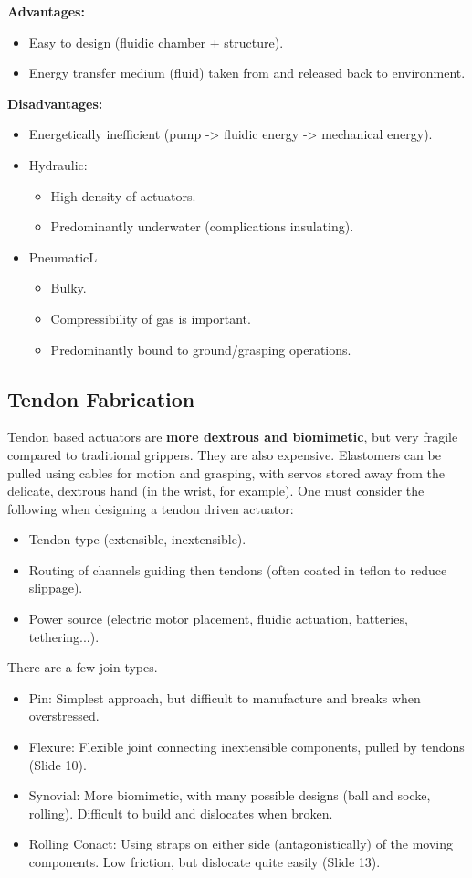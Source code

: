 \documentclass[onecolumn,a4paper]{article}
\begin{document}
\textbf{Advantages:}
\begin{itemize}
    \item Easy to design (fluidic chamber + structure).
    \item Energy transfer medium (fluid) taken from and released back to environment.
\end{itemize}
\textbf{Disadvantages:}
\begin{itemize}
    \item Energetically inefficient (pump -> fluidic energy -> mechanical energy).
    \item Hydraulic:
    \begin{itemize}
        \item High density of actuators.
        \item Predominantly underwater (complications insulating).
    \end{itemize}
    \item PneumaticL
    \begin{itemize}
        \item Bulky.
        \item Compressibility of gas is important.
        \item Predominantly bound to ground/grasping operations.
    \end{itemize}
\end{itemize}

\subsection{Tendon Fabrication}

Tendon based actuators are \textbf{more dextrous and biomimetic}, but very fragile compared to traditional grippers. They are also expensive. Elastomers can be pulled using cables for motion and grasping, with servos stored away from the delicate, dextrous hand (in the wrist, for example). One must consider the following when designing a tendon driven actuator:
\begin{itemize}
    \item Tendon type (extensible, inextensible).
    \item Routing of channels guiding then tendons (often coated in teflon to reduce slippage).
    \item Power source (electric motor placement, fluidic actuation, batteries, tethering...).
\end{itemize}

There are a few join types.
\begin{itemize}
    \item Pin: Simplest approach, but difficult to manufacture and breaks when overstressed.
    \item Flexure: Flexible joint connecting inextensible components, pulled by tendons (Slide 10).
    \item Synovial: More biomimetic, with many possible designs (ball and socke, rolling). Difficult to build and dislocates when broken.
    \item Rolling Conact: Using straps on either side (antagonistically) of the moving components. Low friction, but dislocate quite easily (Slide 13).
\end{itemize}
\end{document}
